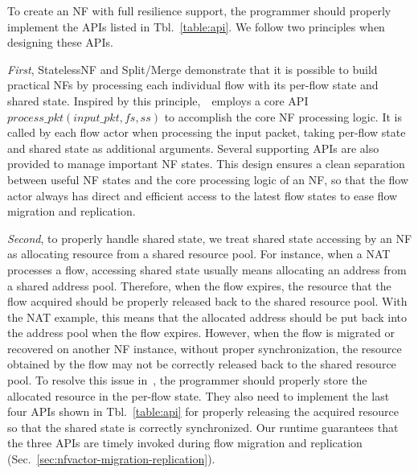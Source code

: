 To create an NF with full resilience support, the programmer should properly implement the APIs listed in Tbl.~\ref{table:api}. We follow two principles when designing these APIs.

{\em First}, StatelessNF \cite{201545} and Split/Merge \cite{rajagopalan2013split} demonstrate that it is possible to build practical NFs by processing each individual flow with its per-flow state and shared state. Inspired by this principle,~\nfactor~employs a core API $process\_pkt(input\_pkt, fs, ss)$ to accomplish the core NF processing logic. It is called by each flow actor when processing the input packet, taking per-flow state and shared state as additional arguments. Several supporting APIs are also provided to manage important NF states. This design %
 ensures a clean separation between useful NF states and the core processing logic of an NF, so that the flow actor always has direct and efficient access to the latest flow states to ease flow migration and replication.

{\em Second}, to properly handle shared state, we treat shared state accessing by an NF as allocating resource from a shared resource pool. For instance, when a NAT processes a flow, accessing shared state usually means allocating an address from a shared address pool. Therefore, when the flow expires, the resource that the flow acquired should be properly released back to the shared resource pool. With the NAT example, this means that the allocated address should be put back into the address pool when the flow expires. However, when the flow is migrated or recovered on another NF instance, without proper synchronization, the resource obtained by the flow may not be correctly released back to the shared resource pool. To resolve this issue in~\nfactor, the programmer should properly store the allocated resource in the per-flow state. They also need to implement the last four APIs shown in Tbl.~\ref{table:api} for properly releasing the acquired resource so that the shared state is correctly synchronized. Our runtime guarantees that the three APIs are timely invoked during flow migration and replication (Sec.~\ref{sec:nfvactor-migration-replication}).



